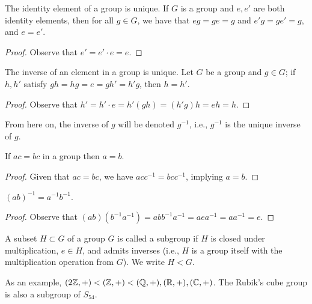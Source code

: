 \begin{theorem}
    The identity element of a group is unique. If $G$ is a group and $e, e'$ are both identity elements, then for all $g \in G$, we have that $eg = ge = g$ and $e'g = ge' = g$, and $e = e'$.
\end{theorem}
\begin{proof}
    Observe that $e' = e' \cdot e = e$.
\end{proof}
\begin{theorem}
    The inverse of an element in a group is unique. Let $G$ be a group and $g \in G$; if $h, h'$ satisfy $gh = hg = e = gh' = h'g$, then $h = h'$.
\end{theorem}
\begin{proof}
    Observe that $h' = h' \cdot e = h' (gh) = (h' g) h = eh = h$.
\end{proof}
\noindent From here on, the inverse of $g$ will be denoted $g^{-1}$, i.e., $g^{-1}$ is the unique inverse of $g$.
\begin{theorem}
    If $ac = bc$ in a group then $a = b$.
\end{theorem}
\begin{proof}
    Given that $ac = bc$, we have $ac c^{-1} = bc c^{-1}$, implying $a = b$.
\end{proof}
\begin{theorem}
    $(ab)^{-1} = a^{-1} b^{-1}$.
\end{theorem}
\begin{proof}
    Observe that $(ab) (b^{-1}a^{-1}) = abb^{-1}a^{-1} = aea^{-1} = aa^{-1} = e$.
\end{proof}
\begin{definition}
    A subset $H \subset G$ of a group $G$ is called a subgroup if $H$ is closed under multiplication, $e \in H$, and admits inverses (i.e., $H$ is a group itself with the multiplication operation from $G$). We write $H < G$.
\end{definition}
\noindent As an example, $(2 \mathbb Z, +) < (\mathbb Z, +) < (\mathbb Q, +), (\mathbb R, +), (\mathbb C, +)$. The Rubik's cube group is also a subgroup of $S_{54}$.